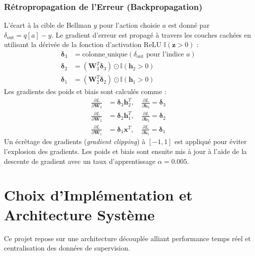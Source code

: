 \documentclass[11pt,a4paper]{article}
\begin{document}
\subsubsection{Rétropropagation de l'Erreur (Backpropagation)}
L'écart à la cible de Bellman $y$ pour l'action choisie $a$ est donné par $\delta_{\text{out}} = q[a] - y$. Le gradient d'erreur est propagé à travers les couches cachées en utilisant la dérivée de la fonction d'activation ReLU $\mathbb{I}(\mathbf{z} > 0)$ :
\begin{align}
    \boldsymbol{\delta}_3 &= \text{colonne\_unique}(\delta_{\text{out}} \text{ pour l'indice } a) \\
    \boldsymbol{\delta}_2 &= \left( \mathbf{W}_3^T \boldsymbol{\delta}_3 \right) \odot \mathbb{I}(\mathbf{h}_2 > 0) \\
    \boldsymbol{\delta}_1 &= \left( \mathbf{W}_2^T \boldsymbol{\delta}_2 \right) \odot \mathbb{I}(\mathbf{h}_1 > 0)
\end{align}
Les gradients des poids et biais sont calculés comme :
\begin{align}
    \frac{\partial L}{\partial \mathbf{W}_3} &= \boldsymbol{\delta}_3 \mathbf{h}_2^T, \quad \frac{\partial L}{\partial \mathbf{b}_3} = \boldsymbol{\delta}_3 \\
    \frac{\partial L}{\partial \mathbf{W}_2} &= \boldsymbol{\delta}_2 \mathbf{h}_1^T, \quad \frac{\partial L}{\partial \mathbf{b}_2} = \boldsymbol{\delta}_2 \\
    \frac{\partial L}{\partial \mathbf{W}_1} &= \boldsymbol{\delta}_1 \mathbf{x}^T, \quad \frac{\partial L}{\partial \mathbf{b}_1} = \boldsymbol{\delta}_1
\end{align}
Un écrêtage des gradients (\textit{gradient clipping}) à $[-1, 1]$ est appliqué pour éviter l'explosion des gradients. Les poids et biais sont ensuite mis à jour à l'aide de la descente de gradient avec un taux d'apprentissage $\alpha = 0.005$.

\section{Choix d'Implémentation et Architecture Système}
Ce projet repose sur une architecture découplée alliant performance temps réel et centralisation des données de supervision.
\end{document}

